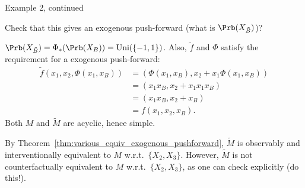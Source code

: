 \begin{frame}{Example 2, continued}
  \begin{Exc}
Check that this gives an exogenous push-forward (what is $\Prb(X_{\tilde{B}})$)?
  \end{Exc}
  \pause
\begin{Eg}
$\Prb(X_{\tilde{B}}) = \Phi_*(\Prb(X_B)) = \mathrm{Uni}(\{-1,1\})$.
Also, $\tilde{f}$ and $\Phi$ satisfy the requirement for a exogenous push-forward:
  $$\begin{aligned}
    \tilde{f}(x_1,x_2,\Phi(x_1,x_B)) 
    &= (\Phi(x_1,x_B), x_2 + x_1 \Phi(x_1,x_B)) \\
    &= (x_1 x_B, x_2 + x_1 x_1 x_B) \\
    &= (x_1 x_B, x_2 + x_B) \\
    &= f(x_1,x_2,x_B).
  \end{aligned}$$
Both $M$ and $\tilde{M}$ are acyclic, hence simple.

By Theorem~\ref{thm:various_equiv_exogenous_pushforward}, $\tilde{M}$ is observably and interventionally equivalent to $M$ w.r.t.\ $\{X_2,X_3\}$.
However, $\tilde{M}$ is not counterfactually equivalent to $M$ w.r.t.\ $\{X_2,X_3\}$, as one can check explicitly (do this!).
\end{Eg}
\end{frame}

